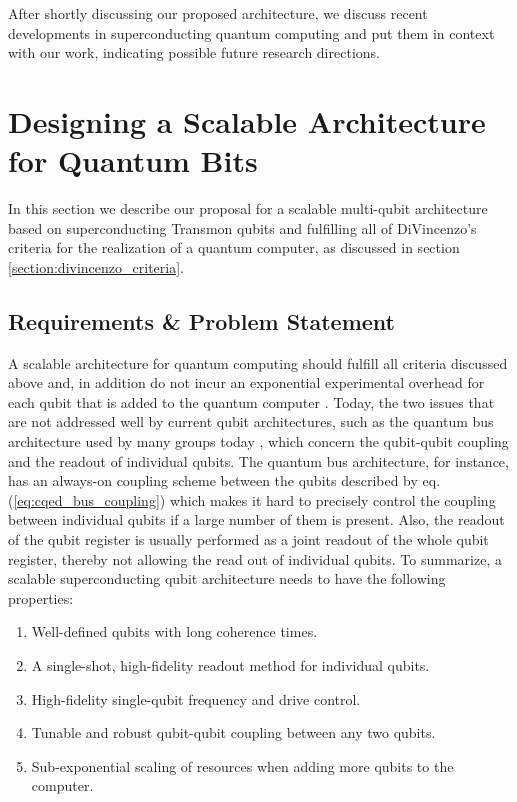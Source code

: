 After shortly discussing our proposed architecture, we discuss recent developments in superconducting quantum computing and put them in context with our work, indicating possible future research directions.

\section{Designing a Scalable Architecture for Quantum Bits} \label{section:scalable_architecture}

In this section we describe our proposal for a scalable multi-qubit architecture based on superconducting Transmon qubits and fulfilling all of DiVincenzo's criteria for the realization of a quantum computer, as discussed in section \ref{section:divincenzo_criteria}. \citep{steane_how_2007}

\subsection{Requirements \& Problem Statement}

A scalable architecture for quantum computing should fulfill all criteria discussed above and, in addition do not incur an exponential experimental overhead for each qubit that is added to the quantum computer \citep{blume-kohout_climbing_2002}. Today, the two issues that are not addressed well by current qubit architectures, such as the quantum bus architecture used by many groups today \citep{dicarlo_demonstration_2009,wallraff_strong_2004}, which concern the qubit-qubit coupling and the readout of individual qubits. The quantum bus architecture, for instance, has an always-on coupling scheme between the qubits described by eq. (\ref{eq:cqed_bus_coupling}) which makes it hard to precisely control the coupling between individual qubits if a large number of them is present. Also, the readout of the qubit register is usually performed as a joint readout of the whole qubit register, thereby not allowing the read out of individual qubits. To summarize, a scalable superconducting qubit architecture needs to have the following properties:

\begin{enumerate}
\item Well-defined qubits with long coherence times.
\item A single-shot, high-fidelity readout method for individual qubits.
\item High-fidelity single-qubit frequency and drive control.
\item Tunable and robust qubit-qubit coupling between any two qubits.
\item Sub-exponential scaling of resources when adding more qubits to the computer.
\end{enumerate}

